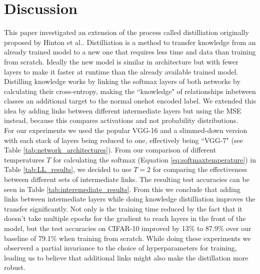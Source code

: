 \documentclass[10pt,twocolumn,letterpaper]{article}
\begin{document}



\section{Discussion}
This paper investigated an extension of the process called distilliation originally proposed by Hinton et al.\cite{hinton2015distilling}. Distilliation is a method to transfer knowledge from an already trained model to a new one that requires less time and data than training from scratch. Ideally the new model is similar in architecture but with fewer layers to make it faster at runtime than the already available trained model. Distilling knowledge works by linking the softmax layers of both networks by calculating their cross-entropy, making the ``knowledge" of relationships inbetween classes an additional target to the normal onehot encoded label. We extended this idea by adding links between different intermediate layers but using the MSE instead, because this compares activations and not probability distributions.\\
For our experiments we used the popular VGG-16 and a slimmed-down version with each stack of layers being reduced to one, effectively being ``VGG-7" (see Table \ref{tab:network_architectures}). From our comparison of different temperatures $T$ for calculating the softmax (Equation \ref{eq:softmaxtemperature}) in Table \ref{tab:LL_results}, we decided to use $T=2$ for comparing the effectiveness between different sets of intermediate links. The resulting test accuracies can be seen in Table \ref{tab:interemediate_results}. From this we conclude that adding links between intermediate layers while doing knowledge distilliation improves the transfer significantly. Not only is the training time reduced by the fact that it doesn't take multiple epochs for the gradient to reach layers in the front of the model, but the test accuracies on CIFAR-10 \cite{krizhevsky2009learning} improved by 13\% to 87.9\% over our baseline of 79.1\% when training from scratch. While doing these experiments we observerd a partial invariance to the choice of hyperparameters for training, leading us to believe that additional links might also make the distillation more robust.\\
\end{document}
